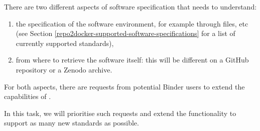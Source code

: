 \begin{task}[
  title=Support more software specification standards,
  id=buildpacks,
  lead=SRL,
  PM=12,
  wphases={0-36},
  partners={MP}
  ]

  There are two different aspects of software specification that \repotodocker{}
  needs to understand:
  \begin{enumerate}
  \item the specification of the software environment, for example through
     files, etc (see Section
    \ref{repo2docker-supported-software-specifications} for a list of currently
    supported standards),
  \item from where to retrieve the software itself: this will be different on a
    GitHub repository or a Zenodo archive. 
  \end{enumerate}

  For both aspects, there are requests from potential Binder users to extend the
  capabilities of \repotodocker{}.

  In this task, we will prioritise such requests and extend the \repotodocker{}
  functionality to support as many new standards as possible.

\end{task}
